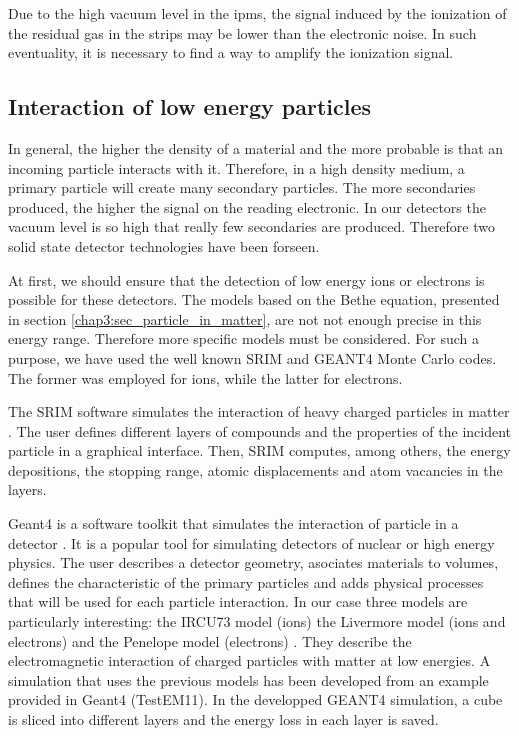 \begin{refsection}
  

  Due to the high vacuum level in the \acrshort{ipm}s, the signal induced by the ionization of the residual gas in the strips may be lower than the  electronic noise. In such eventuality, it is necessary to find a way to amplify the ionization signal.

  \subsection{Interaction of low energy particles}
  \label{chap3:low_energy}
  In general, the higher the density of a material and the more probable is that an incoming particle interacts with it. Therefore, in a high density medium, a primary particle will create many secondary particles. The more secondaries produced, the higher the signal on the reading electronic. In our detectors the vacuum level is so high that really few secondaries are produced. Therefore two solid state detector technologies have been forseen.

  At first, we should ensure that the detection of low energy ions or electrons is possible for these detectors. The models based on the Bethe equation, presented in section \ref{chap3:sec_particle_in_matter}, are not not enough precise in this energy range. Therefore more specific models must be considered. For such a purpose, we have used the well known SRIM and GEANT4 Monte Carlo codes. The former was employed for ions, while the latter for electrons.

  The SRIM software simulates the interaction of heavy charged particles in matter \cite{srim2013}. The user defines different layers of compounds and the properties of the incident particle in a graphical interface. Then, SRIM computes, among others, the energy depositions, the stopping range, atomic displacements and atom vacancies in the layers.

  Geant4 is a software toolkit that simulates the interaction of particle in a detector \cite{Allison2006, Allison2016}. It is a popular tool for simulating detectors of nuclear or high energy physics. The user describes a detector geometry, asociates materials to volumes, defines the characteristic of the primary particles and adds physical processes that will be used for each particle interaction.
  In our case three models are particularly interesting: the IRCU73 model (ions) the Livermore model (ions and electrons) and the Penelope model (electrons) \cite{Bimbot73,livermore97, salvat2009}. They describe the electromagnetic interaction of charged particles with matter at low energies. A simulation that uses the previous models has been developed from an example provided in Geant4 (TestEM11). In the developped GEANT4 simulation, a cube is sliced into different layers and the energy loss in each layer is saved.


\end{refsection}
